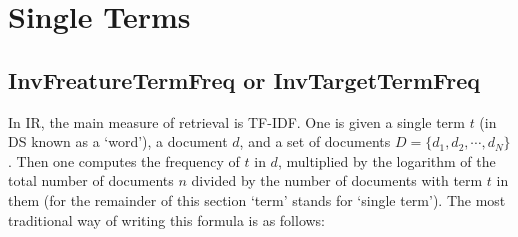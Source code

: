 




\section{Single Terms}


\subsection{InvFreatureTermFreq or InvTargetTermFreq}




 

In IR, the main measure of retrieval is TF-IDF. One is given a  single term $t$ (in DS known as a `word'),  a document $d$, and a set of documents $D = \{d_1, d_2, \cdots, d_N\}$. Then one computes  the frequency  of   $t$  in $d$, multiplied by  the logarithm of the  total number of documents $n$ divided by the number of documents with  term $t$ in them (for the remainder of this section `term' stands for `single term'). The most traditional way of writing this formula is as  follows:

